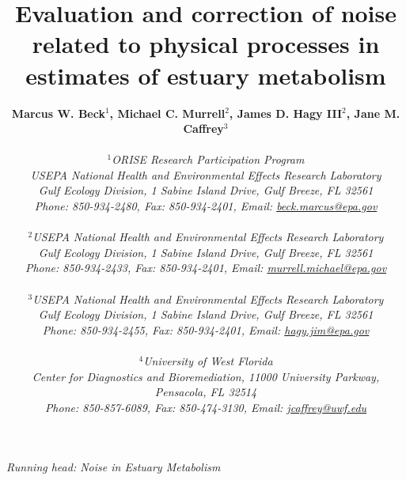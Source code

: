 \begin{singlespace}
\title{{\bf {\Large Evaluation and correction of noise related to physical processes in estimates of estuary metabolism}}}
\author{
  {\bf {\normalsize Marcus W. Beck$^1$, Michael C. Murrell$^2$, James D. Hagy III$^2$, Jane M. Caffrey$^3$}}
  \\\\{\textit {\normalsize $^1$ORISE Research Participation Program}}
  \\{\textit {\normalsize USEPA National Health and Environmental Effects Research Laboratory}}
	\\{\textit {\normalsize Gulf Ecology Division, 1 Sabine Island Drive, Gulf Breeze, FL 32561}}
	\\{\textit {\normalsize Phone: 850-934-2480, Fax: 850-934-2401, Email: \href{mailto:beck.marcus@epa.gov}{beck.marcus@epa.gov}}}
  \\\\{\textit {\normalsize $^2$USEPA National Health and Environmental Effects Research Laboratory}}
	\\{\textit {\normalsize Gulf Ecology Division, 1 Sabine Island Drive, Gulf Breeze, FL 32561}}
	\\{\textit {\normalsize Phone: 850-934-2433, Fax: 850-934-2401, Email: \href{mailto:murrell.michael@epa.gov}{murrell.michael@epa.gov}}}
  \\\\{\textit {\normalsize $^3$USEPA National Health and Environmental Effects Research Laboratory}}
	\\{\textit {\normalsize Gulf Ecology Division, 1 Sabine Island Drive, Gulf Breeze, FL 32561}}
	\\{\textit {\normalsize Phone: 850-934-2455, Fax: 850-934-2401, Email: \href{mailto:hagy.jim@epa.gov}{hagy.jim@epa.gov}}}
  \\\\{\textit {\normalsize $^4$University of West Florida}}
	\\{\textit {\normalsize Center for Diagnostics and Bioremediation, 11000 University Parkway, Pensacola, FL 32514}}
	\\{\textit {\normalsize Phone: 850-857-6089, Fax: 850-474-3130, Email: \href{mailto:jcaffrey@uwf.edu}{jcaffrey@uwf.edu}}}
	}
\date{}
\maketitle
\vfill{\centerline{\textit {\normalsize Running head: Noise in Estuary Metabolism}}}
\end{singlespace}
\clearpage